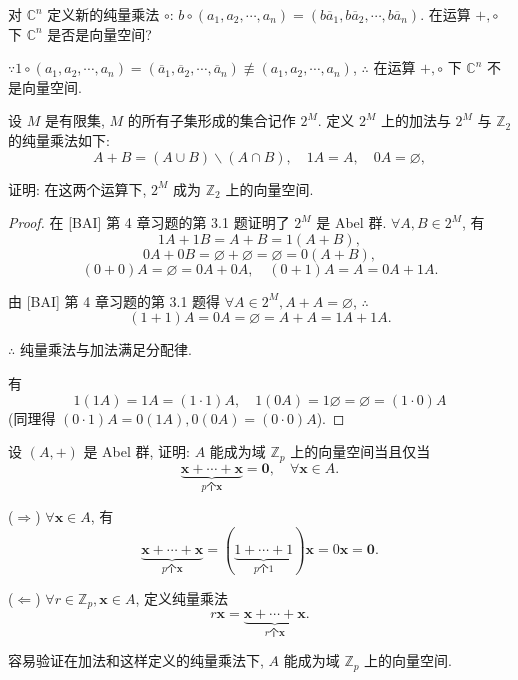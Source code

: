 \documentclass[color=black,device=normal,lang=cn,mode=geye]{elegantnote}
\begin{document}
\begin{exercisec}[1.1.11]
    对 $\mathbb{C}^n$ 定义新的纯量乘法 $\circ$: $b\circ(a_1,a_2,\cdots,a_n)=(b\overline{a}_1,b\overline{a}_2,\cdots,b\overline{a}_n)$. 在运算 $+,\circ$ 下 $\mathbb{C}^n$ 是否是向量空间?
\end{exercisec}
\begin{solution}
    $\because 1\circ(a_1,a_2,\cdots,a_n)=(\overline{a}_1,\overline{a}_2,\cdots,\overline{a}_n)\not\equiv(a_1,a_2,\cdots,a_n)$, $\therefore$ 在运算 $+,\circ$ 下 $\mathbb{C}^n$ 不是向量空间.
\end{solution}
\begin{exercisec}[1.1.12]
    设 $M$ 是有限集, $M$ 的所有子集形成的集合记作 $2^M$. 定义 $2^M$ 上的加法与 $2^M$ 与 $\mathbb{Z}_2$ 的纯量乘法如下:
    \[A+B=(A\cup B)\backslash(A\cap B),\quad 1A=A,\quad0A=\varnothing,\]

    证明: 在这两个运算下, $2^M$ 成为 $\mathbb{Z}_2$ 上的向量空间.
\end{exercisec}
\begin{proof}
    在 [BAI] 第 4 章习题的第 3.1 题证明了 $2^M$ 是 Abel 群. $\forall A,B\in2^M$, 有
    \[1A+1B=A+B=1(A+B),\]
    \[0A+0B=\varnothing+\varnothing=\varnothing=0(A+B),\]
    \[(0+0)A=\varnothing=0A+0A,\quad(0+1)A=A=0A+1A.\]

    由 [BAI] 第 4 章习题的第 3.1 题得 $\forall A\in2^M,A+A=\varnothing$, $\therefore$
    \[(1+1)A=0A=\varnothing=A+A=1A+1A.\]

    $\therefore$ 纯量乘法与加法满足分配律.

    有
    \[1(1A)=1A=(1\cdot1)A,\quad1(0A)=1\varnothing=\varnothing=(1\cdot0)A\]
    (同理得 $(0\cdot1)A=0(1A),0(0A)=(0\cdot0)A$).
\end{proof}
\begin{exercisec}[1.1.13]
    设 $(A,+)$ 是 Abel 群, 证明: $A$ 能成为域 $\mathbb{Z}_p$ 上的向量空间当且仅当
    \[\underbrace{\boldsymbol{x}+\cdots+\boldsymbol{x}}_{p\text{个}\boldsymbol{x}}=\boldsymbol{0},\quad\forall\boldsymbol{x}\in A.\]
\end{exercisec}
\begin{solution}
    ($\Rightarrow$) $\forall\boldsymbol{x}\in A$, 有
    \[\underbrace{\boldsymbol{x}+\cdots+\boldsymbol{x}}_{p\text{个}\boldsymbol{x}}=(\underbrace{1+\cdots+1}_{p\text{个}1})\boldsymbol{x}=0\boldsymbol{x}=\boldsymbol{0}.\]

    ($\Leftarrow$) $\forall r\in\mathbb{Z}_p,\boldsymbol{x}\in A$, 定义纯量乘法
    \[r\boldsymbol{x}=\underbrace{\boldsymbol{x}+\cdots+\boldsymbol{x}}_{r\text{个}\boldsymbol{x}}.\]

    容易验证在加法和这样定义的纯量乘法下, $A$ 能成为域 $\mathbb{Z}_p$ 上的向量空间.
\end{solution}
\end{document}
